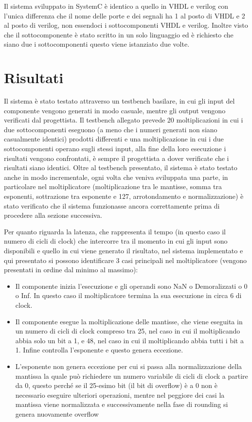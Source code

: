\documentclass[]{IEEEtran}
\begin{document}
Il sistema sviluppato in SystemC è identico a quello in VHDL e verilog con l’unica differenza che il nome delle porte e dei segnali ha 1 al posto di VHDL e 2 al posto di verilog, non essendoci i sottocomponenti VHDL e verilog. Inoltre visto che il sottocomponente è stato scritto in un solo linguaggio ed è richiesto che siano due i sottocomponenti questo viene istanziato due volte.

\section{Risultati}

Il sistema è stato testato attraverso un testbench basilare, in cui gli input del componente vengono generati in modo casuale, mentre gli output vengono verificati dal progettista. Il testbench allegato prevede 20 moltiplicazioni in cui i due sottocomponenti eseguono (a meno che i numeri generati non siano casualmente identici) prodotti differenti e una moltiplicazione in cui i due sottocomponenti operano sugli stessi input, alla fine della loro esecuzione i risultati vengono confrontati, è sempre il progettista a dover verificate che i risultati siano identici.
Oltre al testbench presentato, il sistema è stato testato anche in modo incrementale, ogni volta che veniva sviluppata una parte, in particolare nel moltiplicatore (moltiplicazione tra le mantisse, somma tra esponenti, sottrazione tra esponente e 127, arrotondamento e normalizzazione) è stato verificato che il sistema funzionasse ancora correttamente prima di procedere alla sezione successiva.

Per quanto riguarda la latenza, che rappresenta il tempo (in questo caso il numero di cicli di clock) che intercorre tra il momento in cui gli input sono disponibili e quello in cui viene generato il risultato, nel sistema implementato e qui presentato si possono identificare 3 casi principali nel moltiplicatore (vengono presentati in ordine dal minimo al massimo):

\begin{itemize}
	\item Il componente inizia l'esecuzione e gli operandi sono NaN o Demoralizzati o 0 o Inf. In questo caso il moltiplicatore termina la sua esecuzione in circa 6 di clock.
	\item Il componente esegue la moltiplicazione delle mantisse, che viene eseguita in un numero di cicli di clock compreso tra 25, nel caso in cui il moltiplicando abbia solo un bit a 1, e 48, nel caso in cui il moltiplicando abbia tutti i bit a 1. Infine controlla l'esponente e questo genera eccezione.
	\item L'esponente non genera eccezione per cui si passa alla normalizzazione della mantissa la quale può richiedere un numero variabile di cicli di clock a partire da 0, questo perché se il 25-esimo bit (il bit di overflow) è a 0 non è necessario eseguire ulteriori operazioni, mentre nel peggiore dei casi la mantissa viene normalizzata e successivamente nella fase di rounding si genera nuovamente overflow
\end{itemize}
\end{document}
